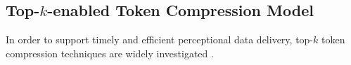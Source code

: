 \documentclass[lettersize,journal]{IEEEtran}
\theoremstyle{custom}
\begin{document}

\subsection{Top-$k$-enabled Token Compression Model}
In order to support timely and efficient perceptional data delivery, top-$k$ token compression techniques are widely investigated \cite{yang2025efficientvla,liu2026vlapruner,wang2026specprune}. 
\end{document}
